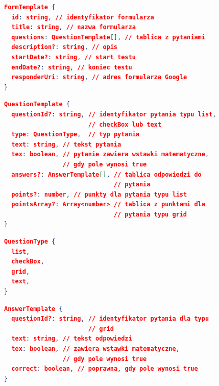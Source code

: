 \begin{figure}[H]
  \begin{lstlisting}[language=json,firstnumber=1]
FormTemplate {
  id: string, // identyfikator formularza
  title: string, // nazwa formularza
  questions: QuestionTemplate[], // tablica z pytaniami
  description?: string, // opis
  startDate?: string, // start testu
  endDate?: string, // koniec testu
  responderUri: string, // adres formularza Google
}
  \end{lstlisting}
\end{figure}
\begin{figure}[H]
  \begin{lstlisting}[language=json,firstnumber=1]
QuestionTemplate {
  questionId?: string, // identyfikator pytania typu list, 
                       // checkBox lub text
  type: QuestionType,  // typ pytania
  text: string, // tekst pytania
  tex: boolean, // pytanie zawiera wstawki matematyczne, 
                // gdy pole wynosi true
  answers?: AnswerTemplate[], // tablica odpowiedzi do 
                              // pytania
  points?: number, // punkty dla pytania typu list
  pointsArray?: Array<number> // tablica z punktami dla 
                              // pytania typu grid
}
  \end{lstlisting}
\end{figure}
\begin{figure}[H]
  \begin{lstlisting}[language=json,firstnumber=1]
QuestionType {
  list,
  checkBox,
  grid,
  text,
}
  \end{lstlisting}
\end{figure}
\begin{figure}[H]
  \begin{lstlisting}[language=json,firstnumber=1]
AnswerTemplate {
  questionId?: string, // identyfikator pytania dla typu 
                       // grid
  text: string, // tekst odpowiedzi
  tex: boolean, // zawiera wstawki matematyczne, 
                // gdy pole wynosi true
  correct: boolean, // poprawna, gdy pole wynosi true
}
  \end{lstlisting}
\end{figure}

